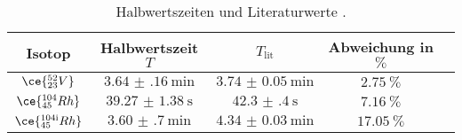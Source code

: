\begin{table}
  \centering
  \caption{Halbwertszeiten und Literaturwerte \cite{rhodium} \cite{vanadium}.}
  \label{tab:params123}
  \bgroup
    \def\arraystretch{1.5}
  \begin{tabular}{c c c c S[table-format=2.2]}
    \toprule
    {Isotop}& Halbwertszeit {$T$} & {$T_\text{lit}$} & Abweichung in {$\si{\percent}$}\\
    \midrule
    $\ce{^{52}_{23}V}$  & $\SI{3.64(16)}{\minute}$  & $\SI{3.74(5)}{\minute}$  & $\SI{2.75}{\percent}$\\
    $\ce{^{104}_{45}Rh}$  & $\SI{39.27(138)}{\second}$   & $\SI{42.3(4)}{\second}$ & $\SI{7.16}{\percent}$ \\
    $\ce{^{104{\text{i}}}_{45}Rh}$ & $\SI{3.60(70)}{\minute}$ & $\SI{4.34(3)}{\minute}$ & $\SI{17.05}{\percent}$   \\
    \bottomrule
  \end{tabular}
  \egroup
\end{table}